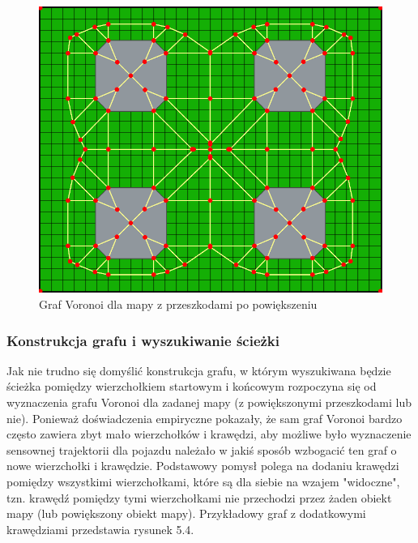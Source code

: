 \documentclass[a4paper,11pt,twoside]{report}
\theoremstyle{definition}
\begin{document}
\begin{figure}[h!]
\centering
\includegraphics[scale=0.4]{voronoiGraphForExpandedMap}
\caption[Graf Voronoi dla mapy z przeszkodami po powiększeniu]{Graf Voronoi dla mapy z przeszkodami po powiększeniu}
\end{figure}

\subsubsection{Konstrukcja grafu i wyszukiwanie ścieżki}

Jak nie trudno się domyślić konstrukcja grafu, w którym wyszukiwana będzie ścieżka pomiędzy wierzchołkiem startowym i końcowym rozpoczyna się od wyznaczenia grafu Voronoi dla zadanej mapy (z powiększonymi przeszkodami lub nie). Ponieważ doświadczenia empiryczne pokazały, że sam graf Voronoi bardzo często zawiera zbyt mało wierzchołków i krawędzi, aby możliwe było wyznaczenie sensownej trajektorii dla pojazdu należało w jakiś sposób wzbogacić ten graf o nowe wierzchołki i krawędzie. Podstawowy pomysł polega na dodaniu krawędzi pomiędzy wszystkimi wierzchołkami, które są dla siebie na wzajem "widoczne", tzn. krawędź pomiędzy tymi wierzchołkami nie przechodzi przez żaden obiekt mapy (lub powiększony obiekt mapy). Przykładowy graf z dodatkowymi krawędziami przedstawia rysunek 5.4.
\end{document}
